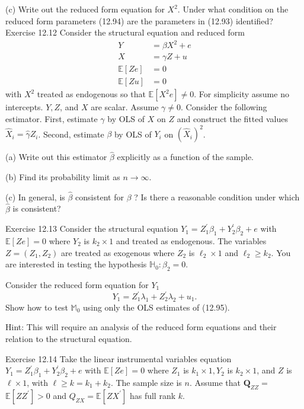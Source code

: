 \documentclass[10pt]{article}
\begin{document}
(c) Write out the reduced form equation for $X^{2}$. Under what condition on the reduced form parameters (12.94) are the parameters in (12.93) identified? Exercise 12.12 Consider the structural equation and reduced form
$$
\begin{aligned}
Y &=\beta X^{2}+e \\
X &=\gamma Z+u \\
\mathbb{E}[Z e] &=0 \\
\mathbb{E}[Z u] &=0
\end{aligned}
$$
with $X^{2}$ treated as endogenous so that $\mathbb{E}\left[X^{2} e\right] \neq 0$. For simplicity assume no intercepts. $Y, Z$, and $X$ are scalar. Assume $\gamma \neq 0$. Consider the following estimator. First, estimate $\gamma$ by OLS of $X$ on $Z$ and construct the fitted values $\widehat{X}_{i}=\widehat{\gamma} Z_{i}$. Second, estimate $\beta$ by OLS of $Y_{i}$ on $\left(\widehat{X}_{i}\right)^{2}$.

(a) Write out this estimator $\widehat{\beta}$ explicitly as a function of the sample.

(b) Find its probability limit as $n \rightarrow \infty$.

(c) In general, is $\widehat{\beta}$ consistent for $\beta$ ? Is there a reasonable condition under which $\widehat{\beta}$ is consistent?

Exercise 12.13 Consider the structural equation $Y_{1}=Z_{1}^{\prime} \beta_{1}+Y_{2}^{\prime} \beta_{2}+e$ with $\mathbb{E}[Z e]=0$ where $Y_{2}$ is $k_{2} \times 1$ and treated as endogenous. The variables $Z=\left(Z_{1}, Z_{2}\right)$ are treated as exogenous where $Z_{2}$ is $\ell_{2} \times 1$ and $\ell_{2} \geq k_{2}$. You are interested in testing the hypothesis $\mathbb{H}_{0}: \beta_{2}=0$.

Consider the reduced form equation for $Y_{1}$
$$
Y_{1}=Z_{1}^{\prime} \lambda_{1}+Z_{2}^{\prime} \lambda_{2}+u_{1} .
$$
Show how to test $\mathbb{M}_{0}$ using only the OLS estimates of (12.95).

Hint: This will require an analysis of the reduced form equations and their relation to the structural equation.

Exercise 12.14 Take the linear instrumental variables equation $Y_{1}=Z_{1}^{\prime} \beta_{1}+Y_{2}^{\prime} \beta_{2}+e$ with $\mathbb{E}[Z e]=0$ where $Z_{1}$ is $k_{1} \times 1, Y_{2}$ is $k_{2} \times 1$, and $Z$ is $\ell \times 1$, with $\ell \geq k=k_{1}+k_{2}$. The sample size is $n$. Assume that $\boldsymbol{Q}_{Z Z}=$ $\mathbb{E}\left[Z Z^{\prime}\right]>0$ and $Q_{Z X}=\mathbb{E}\left[Z X^{\prime}\right]$ has full rank $k$.
\end{document}
